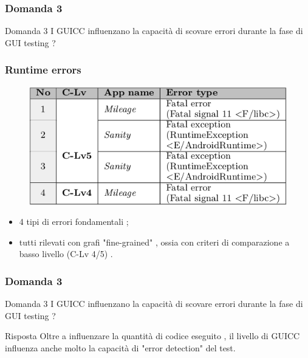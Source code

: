 \documentclass[12pt]{beamer}
\begin{document}


\begin{frame}
\frametitle{Domanda 3}

\begin{block}{Domanda 3}
I GUICC influenzano la capacit\`a di scovare errori durante la fase di GUI testing ?
\end{block}


\end{frame}

\begin{frame}
\frametitle{Runtime errors}
\begin{figure}
\includegraphics[width=0.8\linewidth]{images/errors.png}
\end{figure}

\begin{itemize}
\item 4 tipi di errori fondamentali ;
\item tutti rilevati con grafi "fine-grained" , ossia con criteri di comparazione a basso livello (C-Lv 4/5) .

\end{itemize}

\end{frame}

\begin{frame}
\frametitle{Domanda 3}

\begin{block}{Domanda 3}
I GUICC influenzano la capacit\`a di scovare errori durante la fase di GUI testing  ?
\end{block}

\begin{block}{Risposta}
Oltre a influenzare la quantit\`a di codice eseguito ,  il livello di GUICC influenza anche molto la capacit\`a di "error detection" del test.
\end{block}

\end{frame}
\end{document}

